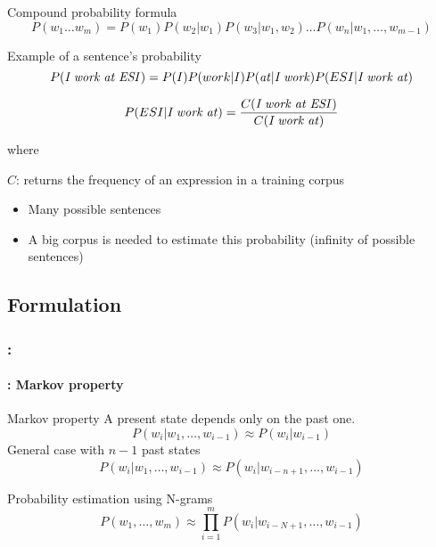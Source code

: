 \documentclass[xcolor=table]{beamer}
\begin{document}
\begin{frame}
	\frametitle{\insertshortsubtitle}
	\framesubtitle{\insertsection}
	
	\vspace{-6pt}
	\begin{block}{Compound probability formula}
		\[ P(w_1 \ldots w_m) =  P(w_1) P(w_2 | w_1) P(w_3 | w_1, w_2) \ldots P(w_n | w_1, \ldots, w_{m-1}) \]
	\end{block}
	
	\vspace{-6pt}
	\begin{exampleblock}{Example of a sentence's probability}
		\[ P(\text{\textit{I work at ESI}}) =  P(I) P(work | I) P(\text{\textit{at}} | \text{\textit{I work}}) P(ESI | \text{\textit{I work at}}) \]
		
		\[ P(ESI | \text{\textit{I work at}}) = \frac{C(\text{\textit{I work at ESI}})}{C( \text{\textit{I work at}})} \] 
		
		where 
		
		$C$: returns the frequency of an expression in a training corpus
	\end{exampleblock}
	
	\begin{itemize}
		\item Many possible sentences
		\item A big corpus is needed to estimate this probability (infinity of possible sentences)
	\end{itemize}

\end{frame}

\subsection{Formulation}

\begin{frame}
	\frametitle{\insertshortsubtitle: \insertsection}
	\framesubtitle{\insertsubsection: Markov property}

	\begin{block}{Markov property}
		A present state depends only on the past one. 
		\[%
		P(w_i | w_1,\ldots, w_{i-1}) \approx P(w_i | w_{i-1})
		\]
		General case with $n-1$ past states
		\[%
		P(w_i | w_1,\ldots, w_{i-1}) \approx P(w_i | w_{i-n+1}, \ldots, w_{i-1})
		\]
	\end{block}
	
	\begin{block}{Probability estimation using N-grams}
		\[
		P(w_1,\ldots, w_{m}) \approx \prod_{i=1}^m P(w_i | w_{i-N+1}, \ldots, w_{i-1})
		\]
	\end{block}

\end{frame}
\end{document}

